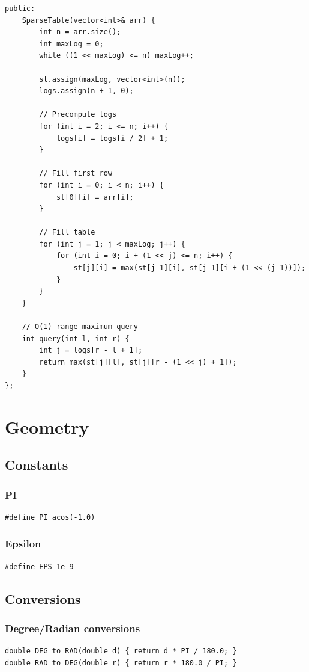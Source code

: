 \documentclass[10pt]{article}
\begin{document}
\begin{multicols*}{2}
\begin{lstlisting}[style=compactcpp]
public:
    SparseTable(vector<int>& arr) {
        int n = arr.size();
        int maxLog = 0;
        while ((1 << maxLog) <= n) maxLog++;

        st.assign(maxLog, vector<int>(n));
        logs.assign(n + 1, 0);

        // Precompute logs
        for (int i = 2; i <= n; i++) {
            logs[i] = logs[i / 2] + 1;
        }

        // Fill first row
        for (int i = 0; i < n; i++) {
            st[0][i] = arr[i];
        }

        // Fill table
        for (int j = 1; j < maxLog; j++) {
            for (int i = 0; i + (1 << j) <= n; i++) {
                st[j][i] = max(st[j-1][i], st[j-1][i + (1 << (j-1))]);
            }
        }
    }

    // O(1) range maximum query
    int query(int l, int r) {
        int j = logs[r - l + 1];
        return max(st[j][l], st[j][r - (1 << j) + 1]);
    }
};
\end{lstlisting}

\section{Geometry}

\subsection{Constants}
\subsubsection{PI}
\begin{lstlisting}[style=compactcpp]
#define PI acos(-1.0)
\end{lstlisting}

\subsubsection{Epsilon}
\begin{lstlisting}[style=compactcpp]
#define EPS 1e-9
\end{lstlisting}

\subsection{Conversions}
\subsubsection{Degree/Radian conversions}
\begin{lstlisting}[style=compactcpp]
double DEG_to_RAD(double d) { return d * PI / 180.0; }
double RAD_to_DEG(double r) { return r * 180.0 / PI; }
\end{lstlisting}


\end{multicols*}
\end{document}
